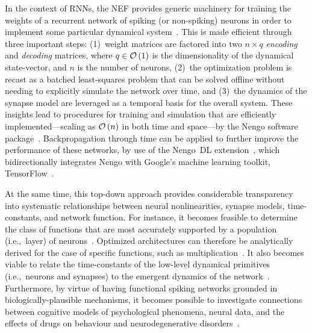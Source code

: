 In the context of RNNs, the NEF provides generic machinery for training the weights of a recurrent network of spiking (or non-spiking) neurons in order to implement some particular dynamical system~\citep{dynamicspatent}.
This is made efficient through three important steps: (1)~weight matrices are factored into two $n \times q$ \emph{encoding} and \emph{decoding} matrices, where $q \in \mathcal{O}\left({1}\right)$ is the dimensionality of the dynamical state-vector, and $n$ is the number of neurons, (2)~the optimization problem is recast as a batched least-squares problem that can be solved offline without needing to explicitly simulate the network over time, and (3)~the dynamics of the synapse model are leveraged as a temporal basis for the overall system.
These insights lead to procedures for training and simulation that are efficiently implemented---scaling as $\mathcal{O}\left({n}\right)$ in both time and space---by the Nengo software package~\citep{bekolay2014}.
Backpropagation through time can be applied to further improve the performance of these networks, by use of the Nengo~DL extension~\citep{hunsberger2018, rasmussen2018nengodl, blouw2018a}, which bidirectionally integrates Nengo with Google's machine learning toolkit, TensorFlow~\citep{abadi2016tensorflow}.

At the same time, this top-down approach provides considerable transparency into systematic relationships between neural nonlinearities, synapse models, time-constants, and network function.
For instance, it becomes feasible to determine the class of functions that are most accurately supported by a population (i.e.,~layer) of neurons~\citep[][pp.~185--217]{eliasmith2003a}.
Optimized architectures can therefore be analytically derived for the case of specific functions, such as multiplication~\citep{jgosmann2015}.
It also becomes viable to relate the time-constants of the low-level dynamical primitives (i.e.,~neurons and synapses) to the emergent dynamics of the network~\citep{voelker2018}.
Furthermore, by virtue of having functional spiking networks grounded in biologically-plausible mechanisms, it becomes possible to investigate connections between cognitive models of psychological phenomena, neural data, and the effects of drugs on behaviour and neurodegenerative disorders~\citep{eliasmith2013build, eliasmith2016biospaun, duggins2017b}.

